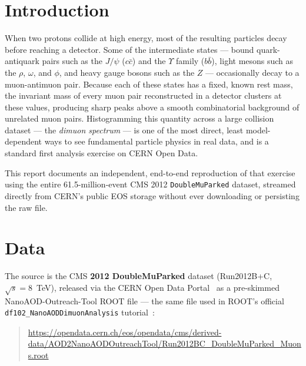 \documentclass[11pt,a4paper]{article}
\begin{document}
\tableofcontents
\newpage

\section{Introduction}

When two protons collide at high energy, most of the resulting particles decay before reaching a
detector. Some of the intermediate states --- bound quark-antiquark pairs such as the $J/\psi$
($c\bar{c}$) and the $\Upsilon$ family ($b\bar{b}$), light mesons such as the $\rho$, $\omega$,
and $\phi$, and heavy gauge bosons such as the $Z$ --- occasionally decay to a muon-antimuon pair.
Because each of these states has a fixed, known rest mass, the invariant mass of every muon pair
reconstructed in a detector clusters at these values, producing sharp peaks above a smooth
combinatorial background of unrelated muon pairs. Histogramming this quantity across a large
collision dataset --- the \emph{dimuon spectrum} --- is one of the most direct, least
model-dependent ways to see fundamental particle physics in real data, and is a standard first
analysis exercise on CERN Open Data.

This report documents an independent, end-to-end reproduction of that exercise using the entire
61.5-million-event CMS 2012 \texttt{DoubleMuParked} dataset, streamed directly from CERN's public
EOS storage without ever downloading or persisting the raw file.

\section{Data}

The source is the CMS \textbf{2012 DoubleMuParked} dataset (Run2012B+C, $\sqrt{s}=8$~TeV),
released via the CERN Open Data Portal~\cite{cern-opendata} as a pre-skimmed
NanoAOD-Outreach-Tool ROOT file --- the same file used in ROOT's official
\texttt{df102\_NanoAODDimuonAnalysis} tutorial~\cite{root-tutorial}:

\begin{quote}
\url{https://opendata.cern.ch/eos/opendata/cms/derived-data/AOD2NanoAODOutreachTool/Run2012BC_DoubleMuParked_Muons.root}
\end{quote}
\end{document}
